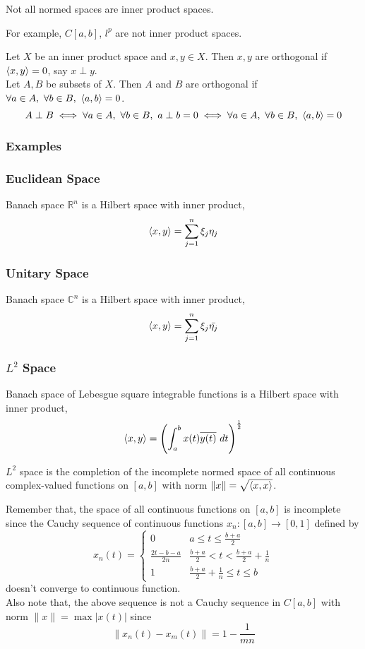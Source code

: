 \begin{important}
	Not all normed spaces are inner product spaces.
\end{important}

	For example, $C[a,b]$, $l^p$ are not inner product spaces.

\begin{definition}[orthogonality]
	Let $X$ be an inner product space and  $x,y \in X$.
	Then $x,y$ are orthogonal if $\left\langle x,y \right\rangle = 0$, say $x \perp y$.\\

	Let $A,B$ be subsets of $X$.
	Then $A$ and $B$ are orthogonal if $\forall a \in A,\ \forall b \in B,\ \left\langle a,b \right\rangle = 0$.
	\[ A \perp B \iff \forall a \in A,\ \forall b \in B,\ a \perp b = 0 \iff \forall a \in A,\ \forall b \in B,\  \left\langle a,b \right\rangle = 0 \]
\end{definition}
\subsubsection{Examples}
\subsubsection{Euclidean Space}
	Banach space $\mathbb{R}^n$ is a Hilbert space with inner product,
	\[ \left\langle x,y \right\rangle = \sum_{j=1}^n \xi_j \eta_j \]
\subsubsection{Unitary Space}
	Banach space $\mathbb{C}^n$ is a Hilbert space with inner product,
	\[ \left\langle x,y \right\rangle = \sum_{j=1}^n \xi_j \bar{\eta_j} \]
\subsubsection{$L^2$ Space}
	Banach space of Lebesgue square integrable functions is a Hilbert space with inner product,
	\[ \left\langle x,y \right\rangle = \left(\int_a^b x(t)\overline{y(t)}\ dt \right)^\frac{1}{2} \]

	$L^2$ space is the completion of the incomplete normed space of all continuous complex-valued functions on $[a,b]$ with norm $\|x\| = \sqrt{\left\langle x,x \right\rangle}$.\\

	\begin{commentary}
		Remember that, the space of all continuous functions on $[a,b]$ is incomplete since the Cauchy sequence of continuous functions $x_n : [a,b] \to [0,1]$ defined by
	\[ x_n(t) = \begin{cases} 0 & a \le t \le \frac{b+a}{2} \\ \frac{2t-b-a}{2n} & \frac{b+a}{2} < t < \frac{b+a}{2} + \frac{1}{n} \\ 1 & \frac{b+a}{2}+\frac{1}{n} \le t \le b \end{cases} \]
		doesn't converge to continuous function.\\

		Also note that, the above sequence is not a Cauchy sequence in $C[a,b]$ with norm $\|x\| = \max |x(t)|$ since 
		\[ \|x_n(t)-x_m(t)\| = 1-\frac{1}{mn} \]
	\end{commentary}
